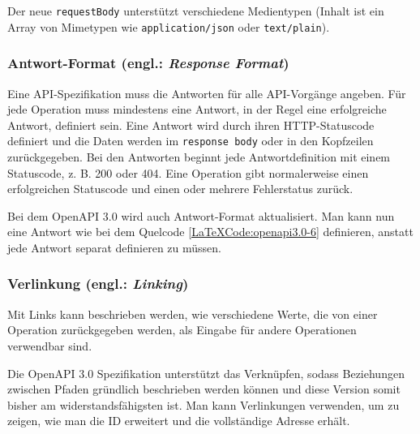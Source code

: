 Der neue \texttt{requestBody} unterstützt verschiedene Medientypen (Inhalt ist ein Array von Mimetypen wie \texttt{application/json} oder \texttt{text/plain})\cite{openapi20Github}.

\subsubsection{Antwort-Format (engl.: \textit{Response Format})}

Eine API-Spezifikation muss die Antworten für alle API-Vorgänge angeben. Für jede Operation muss mindestens eine Antwort, in der Regel eine erfolgreiche Antwort, definiert sein. Eine Antwort wird durch ihren HTTP-Statuscode definiert und die Daten werden im \texttt{response body} oder in den Kopfzeilen zurückgegeben. Bei den Antworten beginnt jede Antwortdefinition mit einem Statuscode, z. B. 200 oder 404. Eine Operation gibt normalerweise einen erfolgreichen Statuscode und einen oder mehrere Fehlerstatus zurück\cite{openapiresponsebody17}.

Bei dem OpenAPI 3.0 wird  auch Antwort-Format aktualisiert. Man kann nun eine Antwort wie bei dem Quelcode \ref{LaTeXCode:openapi3.0-6} definieren, anstatt jede Antwort separat definieren zu müssen\cite{openapi20Github}.

\begin{LaTeXCode}[caption={Open API 3.0 - Antwort-Format},captionpos=b, label=LaTeXCode:openapi3.0-6][numbers=none]
{
	"meinBeispiel": {
		"\$request.body#/url": null,
		"post": {
			"requestBody": {
				"description": "antwort beispiel",
				"content": null,
				"application/json": {
					"schema": null,
					"\$ref": "#/components/schemas/antwortbeispiel"
				},
				"responses": {
					"200": null,
					"description": "antwort funktioniert."
				}
...
\end{LaTeXCode}


\subsubsection{Verlinkung (engl.: \textit{Linking})}

Mit Links kann beschrieben werden, wie verschiedene Werte, die von einer Operation zurückgegeben werden, als Eingabe für andere Operationen verwendbar sind\cite{openapilinks17}.


Die OpenAPI 3.0 Spezifikation unterstützt das Verknüpfen, sodass Beziehungen zwischen Pfaden gründlich beschrieben werden können und diese Version somit bisher am widerstandsfähigsten ist. Man kann Verlinkungen verwenden, um zu zeigen, wie man die ID erweitert und die vollständige Adresse erhält\cite{openapi20Github}.

